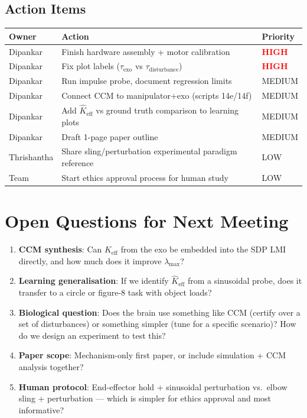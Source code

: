 \documentclass[11pt, a4paper]{article}
\newcommand{\Ke}{K_{\mathrm{eff}}}
\begin{document}
\subsection{Action Items}

\begin{actionbox}
\begin{tabular}{lll}
\toprule
\textbf{Owner} & \textbf{Action} & \textbf{Priority} \\
\midrule
Dipankar & Finish hardware assembly + motor calibration & \textcolor{red}{\textbf{HIGH}} \\
Dipankar & Fix plot labels ($\tau_{\mathrm{exo}}$ vs $\tau_{\mathrm{disturbance}}$) & \textcolor{red}{\textbf{HIGH}} \\
Dipankar & Run impulse probe, document regression limits & MEDIUM \\
Dipankar & Connect CCM to manipulator+exo (scripts 14e/14f) & MEDIUM \\
Dipankar & Add $\hat\Ke$ vs ground truth comparison to learning plots & MEDIUM \\
Dipankar & Draft 1-page paper outline & MEDIUM \\
Thrishantha & Share sling/perturbation experimental paradigm reference & LOW \\
Team & Start ethics approval process for human study & LOW \\
\bottomrule
\end{tabular}
\end{actionbox}

\section{Open Questions for Next Meeting}

\begin{enumerate}
  \item \textbf{CCM synthesis}: Can $\Ke$ from the exo be embedded into the SDP LMI directly,
        and how much does it improve $\lambda_{\max}$?

  \item \textbf{Learning generalisation}: If we identify $\hat\Ke$ from a sinusoidal probe,
        does it transfer to a circle or figure-8 task with object loads?

  \item \textbf{Biological question}: Does the brain use something like CCM
        (certify over a set of disturbances) or something simpler
        (tune for a specific scenario)? How do we design an experiment to test this?

  \item \textbf{Paper scope}: Mechanism-only first paper, or include
        simulation + CCM analysis together?

  \item \textbf{Human protocol}: End-effector hold + sinusoidal perturbation vs.\ elbow
        sling + perturbation --- which is simpler for ethics approval and most informative?
\end{enumerate}
\end{document}

